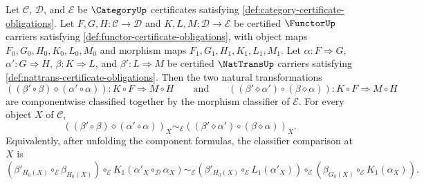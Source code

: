 \begin{theorem}
\label{thm:nattrans-horizontal-vertical-interchange}
Let $\mathcal C$, $\mathcal D$, and $\mathcal E$ be $\CategoryUp$ certificates satisfying \autoref{def:category-certificate-obligations}. Let $F,G,H:\mathcal C\to\mathcal D$ and $K,L,M:\mathcal D\to\mathcal E$ be certified $\FunctorUp$ carriers satisfying \autoref{def:functor-certificate-obligations}, with object maps $F_0,G_0,H_0,K_0,L_0,M_0$ and morphism maps $F_1,G_1,H_1,K_1,L_1,M_1$. Let $\alpha:F\Rightarrow G$, $\alpha':G\Rightarrow H$, $\beta:K\Rightarrow L$, and $\beta':L\Rightarrow M$ be certified $\NatTransUp$ carriers satisfying \autoref{def:nattrans-certificate-obligations}. Then the two natural transformations
$$
((\beta'\circ\beta)\diamond(\alpha'\circ\alpha)):K\circ F\Rightarrow M\circ H
\qquad\text{and}\qquad
((\beta'\diamond\alpha')\circ(\beta\diamond\alpha)):K\circ F\Rightarrow M\circ H
$$
are componentwise classified together by the morphism classifier of $\mathcal E$. For every object $X$ of $\mathcal C$,
$$
((\beta'\circ\beta)\diamond(\alpha'\circ\alpha))_X
\sim_{\mathcal E}
((\beta'\diamond\alpha')\circ(\beta\diamond\alpha))_X.
$$
Equivalently, after unfolding the component formulas, the classifier comparison at $X$ is
$$
(\beta'_{H_0(X)}\circ_{\mathcal E}\beta_{H_0(X)})\circ_{\mathcal E}K_1(\alpha'_X\circ_{\mathcal D}\alpha_X)
\sim_{\mathcal E}
(\beta'_{H_0(X)}\circ_{\mathcal E}L_1(\alpha'_X))\circ_{\mathcal E}(\beta_{G_0(X)}\circ_{\mathcal E}K_1(\alpha_X)).
$$
\end{theorem}
